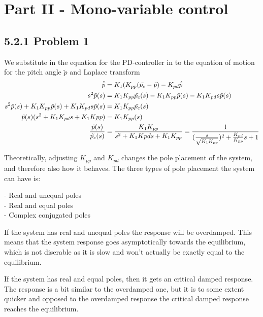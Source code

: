 \section*{Part II - Mono-variable control}

\subsection*{5.2.1 Problem 1}
We substitute in the equation for the PD-controller in to the equation of motion for the pitch angle $\tilde{p}$ and Laplace transform
\begin{align*}
    \ddot{\tilde{p}}                                                    &= K_1(K_{pp}(\tilde{p_c}-\tilde{p})- K_{pd}\dot{\tilde{p}}\\
    s^2\tilde{p}(s)                                                     &= K_1K_{pp}\tilde{p_c}(s)-K_1K_{pp}\tilde{p}(s)-K_1K_{pd}s\tilde{p}(s)\\
    s^2\tilde{p}(s) + K_1K_{pp}\tilde{p}(s) + K_1K_{pd}s\tilde{p}(s)    &= K_1K_{pp}\tilde{p_c}(s)\\
    \tilde{p}(s)(s^2+K_1K_{pd}s + K_1K{pp})                             &= K_1K_{pp}\title{p_c}(s)\\
    \frac{\tilde{p}(s)}{\tilde{p_c}(s)}                                 &= \frac{K_1K_{pp}}{s^2 + K_1K{pd}s + K_1K_{pp}} = \frac{1}{(\frac{s}{\sqrt{K_1K_{pp}}})^2+\frac{K_{pd}}{K_{pp}}s +1}
\end{align*}

Theoretically, adjusting $K_{pp}$ and $K_{pd}$ changes the pole placement of the system, and therefore also how it behaves. The three types of pole placement the system can have is:

- Real and unequal poles\\
- Real and equal poles\\
- Complex conjugated poles

If the system has real and unequal poles the response will be overdamped. This means that the system response goes asymptotically towards the equilibrium, which is not diserable as it is slow and won't actually be exactly equal to the equilibrium. 

If the system has real and equal poles, then it gets an critical damped response. The response is a bit similar to the overdamped one, but it is to some extent quicker and opposed to the overdamped response the critical damped response reaches the equilibrium.

